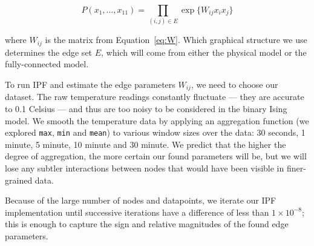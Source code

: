 \begin{equation}
P(x_1,\ldots,x_{11}) = \prod_{(i,j) \in E} \exp\lbrace W_{ij}x_ix_j\rbrace
\end{equation}

where $W_{ij}$ is the matrix from Equation~\ref{eq:W}.
Which graphical structure we use determines the edge set $E$, which will come from either the physical model or the fully-connected model.

To run IPF and estimate the edge parameters $W_{ij}$, we need to choose our dataset.
The raw temperature readings constantly fluctuate --- they are accurate to 0.1 Celsius --- and thus are too noisy to be considered in the binary Ising model.
We smooth the temperature data by applying an aggregation function (we explored \texttt{max}, \texttt{min} and \texttt{mean}) to various window sizes over the data: 30 seconds, 1 minute, 5 minute, 10 minute and 30 minute.
We predict that the higher the degree of aggregation, the more certain our found parameters will be, but we will lose any subtler interactions between nodes that would have been visible in finer-grained data.

Because of the large number of nodes and datapoints, we iterate our IPF implementation until successive iterations have a difference of less than $1 \times 10^{-8}$; this is enough to capture the sign and relative magnitudes of the found edge parameters.
